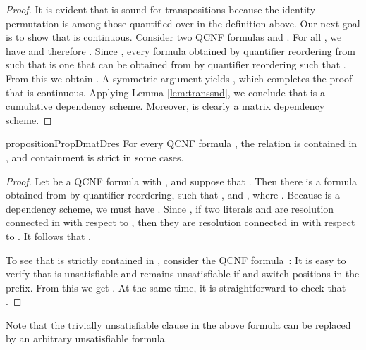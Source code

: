 \documentclass{llncs}
\newcommand{\longversion}[1]{#1}
\newcommand{\shortversion}[1]{}
\begin{document}
\longversion{\longversion{\begin{sloppypar}}
\begin{proof}
  It is evident that  is sound for transpositions because the
  identity permutation is among those quantified over in the definition
  above. Our next goal is to show that  is continuous. Consider two
  QCNF formulas \hskip 0pt and . For all , we have
   and therefore . Since , every
  formula  obtained by quantifier reordering from  such that
   is one that can be obtained from  by
  quantifier reordering such that . From this
  we obtain . A symmetric
  argument yields , which completes the proof that  is
  continuous. Applying Lemma \ref{lem:transsnd}, we conclude that  is
  a cumulative dependency scheme. Moreover,  is clearly a matrix
  dependency scheme.
\end{proof}
\longversion{\end{sloppypar}}
 }
\begin{restatable}{proposition}{PropDmatDres}\label{prop:resdepcontained}\shortversion{\textup{()}}
  For every QCNF formula , the relation  is contained in
  , and containment is strict in some cases.
\end{restatable}
\longversion{\begin{proof}
  Let  be a QCNF formula with , and suppose that
  . Then there is a formula  obtained
  from  by quantifier reordering, such that , and , where \hskip 0pt\hskip 0pt. Because  is a dependency
  scheme, we must have . Since , if two literals  and
   are resolution connected in  with respect
  to , then they
  are resolution connected in  with respect to . It follows that .

  To see that  is strictly contained in , consider the QCNF
  formula~:
   It is easy to verify that  is
  unsatisfiable and remains unsatisfiable if  and 
  switch positions in the prefix. From this we get . At the same time, it is straightforward to check that
  .
\end{proof}
 } 

\longversion{Note that the trivially unsatisfiable clause  in the above
  formula can be replaced by an arbitrary unsatisfiable formula.}
\end{document}
